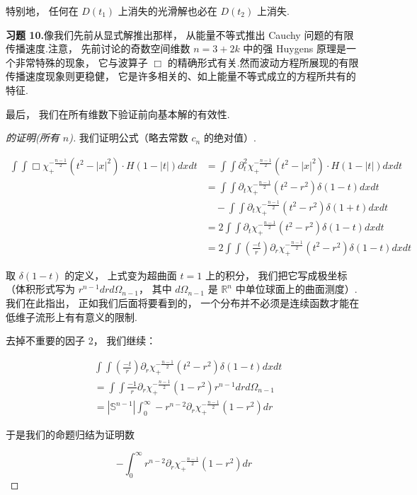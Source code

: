 特别地， 任何在 $D(t_{1})$ 上消失的光滑解也必在 $D(t_{2})$ 上消失.

\noindent\textbf{习题 10.}\quad 像我们先前从显式解推出那样， 从能量不等式推出 Cauchy 问题的有限传播速度.注意， 先前讨论的奇数空间维数 $n = 3+2k$ 中的强 Huygens 原理是一个非常特殊的现象， 它与波算子 $\Box$ 的精确形式有关.然而波动方程所展现的有限传播速度现象则更稳健， 它是许多相关的、如上能量不等式成立的方程所共有的特征.

最后， 我们在所有维数下验证前向基本解的有效性.

\begin{proof}[ 的证明(所有 $n$)]
我们证明公式（略去常数 $c_{n}$ 的绝对值）.

\[
\begin{aligned}
\int\!\!\int \Box\chi_{+}^{-\frac{n-1}{2}}(t^{2}-|x|^{2}) \cdot H(1-|t|)dxdt &= \int\!\!\int\partial_{t}^{2}\chi_{+}^{-\frac{n-1}{2}}(t^{2}-|x|^{2}) \cdot H(1-|t|)dxdt \\
&= \int\!\!\int\partial_{t}\chi_{+}^{-\frac{n-1}{2}}(t^{2}-r^{2})\delta(1-t)dxdt \\
&\quad - \int\!\!\int\partial_{t}\chi_{+}^{-\frac{n-1}{2}}(t^{2}-r^{2})\delta(1+t)dxdt \\
&= 2\int\!\!\int\partial_{t}\chi_{+}^{-\frac{n-1}{2}}(t^{2}-r^{2})\delta(1-t)dxdt \\
&= 2\int\!\!\int\left(\frac{-t}{r}\right)\partial_{r}\chi_{+}^{-\frac{n-1}{2}}(t^{2}-r^{2})\delta(1-t)dxdt
\end{aligned}
\]

取 $\delta(1-t)$ 的定义， 上式变为超曲面 $t = 1$ 上的积分， 我们把它写成极坐标（体积形式写为 $r^{n-1}drd\Omega_{n-1}$， 其中 $d\Omega_{n-1}$ 是 $\mathbb{R}^{n}$ 中单位球面上的曲面测度）.我们在此指出， 正如我们后面将要看到的， 一个分布并不必须是连续函数才能在低维子流形上有有意义的限制.

去掉不重要的因子 2， 我们继续：

\[
\begin{aligned}
&\int\!\!\int\left(\frac{-t}{r}\right)\partial_{r}\chi_{+}^{-\frac{n-1}{2}}(t^{2}-r^{2})\delta(1-t)dxdt \\
&= \int\!\!\int\frac{-1}{r}\partial_{r}\chi_{+}^{-\frac{n-1}{2}}(1-r^{2})r^{n-1}drd\Omega_{n-1} \\
&= |\mathbb{S}^{n-1}|\int_{0}^{\infty}-r^{n-2}\partial_{r}\chi_{+}^{-\frac{n-1}{2}}(1-r^{2})dr
\end{aligned}
\]

于是我们的命题归结为证明数

\[
-\int_{0}^{\infty}r^{n-2}\partial_{r}\chi_{+}^{-\frac{n-1}{2}}(1-r^{2})dr
\]


\end{proof}
